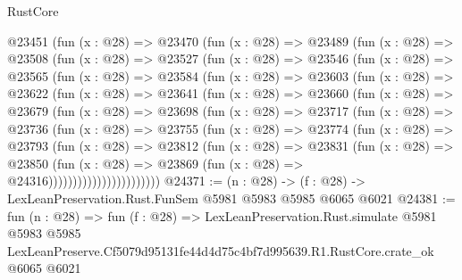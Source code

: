 \begin{lexlean}{RustCore}
\begin{coremodule}
  @23451
    (fun (x : @28) =>
    @23470
      (fun (x : @28) =>
      @23489
        (fun (x : @28) =>
        @23508
          (fun (x : @28) =>
          @23527
            (fun (x : @28) =>
            @23546
              (fun (x : @28) =>
              @23565
                (fun (x : @28) =>
                @23584
                  (fun (x : @28) =>
                  @23603
                    (fun (x : @28) =>
                    @23622
                      (fun (x : @28) =>
                      @23641
                        (fun (x : @28) =>
                        @23660
                          (fun (x : @28) =>
                          @23679
                            (fun (x : @28) =>
                            @23698
                              (fun (x : @28) =>
                              @23717
                                (fun (x : @28) =>
                                @23736
                                  (fun (x : @28) =>
                                  @23755
                                    (fun (x : @28) =>
                                    @23774
                                      (fun (x : @28) =>
                                      @23793
                                        (fun (x : @28) =>
                                        @23812
                                          (fun (x : @28) =>
                                          @23831
                                            (fun (x : @28) =>
                                            @23850
                                              (fun (x : @28) =>
                                              @23869 (fun (x : @28) => @24316)))))))))))))))))))))))
@24371 := (n : @28) -> (f : @28) -> LexLeanPreservation.Rust.FunSem @5981 @5983 @5985 @6065 @6021
@24381 := fun (n : @28) =>
  fun (f : @28) =>
  LexLeanPreservation.Rust.simulate
    @5981
    @5983
    @5985
    LexLeanPreserve.Cf5079d95131fe44d4d75c4bf7d995639.R1.RustCore.crate_ok
    @6065
    @6021
\end{coremodule}
\end{lexlean}
